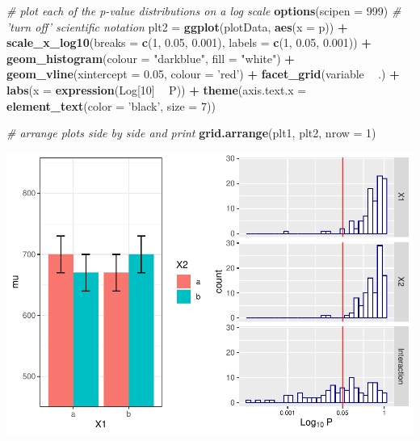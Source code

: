 \documentclass[]{book}
\newenvironment{Shaded}{\begin{snugshade}}{\end{snugshade}}
\newcommand{\CommentTok}[1]{\textcolor[rgb]{0.56,0.35,0.01}{\textit{#1}}}
\newcommand{\DataTypeTok}[1]{\textcolor[rgb]{0.13,0.29,0.53}{#1}}
\newcommand{\DecValTok}[1]{\textcolor[rgb]{0.00,0.00,0.81}{#1}}
\newcommand{\FloatTok}[1]{\textcolor[rgb]{0.00,0.00,0.81}{#1}}
\newcommand{\KeywordTok}[1]{\textcolor[rgb]{0.13,0.29,0.53}{\textbf{#1}}}
\newcommand{\NormalTok}[1]{#1}
\newcommand{\OperatorTok}[1]{\textcolor[rgb]{0.81,0.36,0.00}{\textbf{#1}}}
\newcommand{\StringTok}[1]{\textcolor[rgb]{0.31,0.60,0.02}{#1}}
\begin{document}
\begin{Shaded}
\begin{Highlighting}[]
\CommentTok{# plot each of the p-value distributions on a log scale}
\KeywordTok{options}\NormalTok{(}\DataTypeTok{scipen =} \DecValTok{999}\NormalTok{) }\CommentTok{# 'turn off' scientific notation}
\NormalTok{plt2 =}\StringTok{ }\KeywordTok{ggplot}\NormalTok{(plotData, }\KeywordTok{aes}\NormalTok{(}\DataTypeTok{x =}\NormalTok{ p)) }\OperatorTok{+}
\KeywordTok{scale_x_log10}\NormalTok{(}\DataTypeTok{breaks =} \KeywordTok{c}\NormalTok{(}\DecValTok{1}\NormalTok{, }\FloatTok{0.05}\NormalTok{, }\FloatTok{0.001}\NormalTok{),}
\DataTypeTok{labels =} \KeywordTok{c}\NormalTok{(}\DecValTok{1}\NormalTok{, }\FloatTok{0.05}\NormalTok{, }\FloatTok{0.001}\NormalTok{)) }\OperatorTok{+}
\KeywordTok{geom_histogram}\NormalTok{(}\DataTypeTok{colour =} \StringTok{"darkblue"}\NormalTok{, }\DataTypeTok{fill =} \StringTok{"white"}\NormalTok{) }\OperatorTok{+}
\KeywordTok{geom_vline}\NormalTok{(}\DataTypeTok{xintercept =} \FloatTok{0.05}\NormalTok{, }\DataTypeTok{colour =} \StringTok{'red'}\NormalTok{) }\OperatorTok{+}
\KeywordTok{facet_grid}\NormalTok{(variable }\OperatorTok{~}\StringTok{ }\NormalTok{.) }\OperatorTok{+}
\KeywordTok{labs}\NormalTok{(}\DataTypeTok{x =} \KeywordTok{expression}\NormalTok{(Log[}\DecValTok{10}\NormalTok{] }\OperatorTok{~}\StringTok{ }\NormalTok{P)) }\OperatorTok{+}
\KeywordTok{theme}\NormalTok{(}\DataTypeTok{axis.text.x =} \KeywordTok{element_text}\NormalTok{(}\DataTypeTok{color =} \StringTok{'black'}\NormalTok{, }\DataTypeTok{size =} \DecValTok{7}\NormalTok{))}

\CommentTok{# arrange plots side by side and print}
\KeywordTok{grid.arrange}\NormalTok{(plt1, plt2, }\DataTypeTok{nrow =} \DecValTok{1}\NormalTok{)}
\end{Highlighting}
\end{Shaded}

\includegraphics{SuperpowerValidation_files/figure-latex/unnamed-chunk-109-1.pdf}
\end{document}
